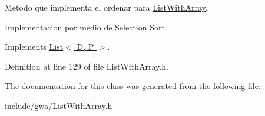 Metodo que implementa el ordenar para \hyperlink{class_list_with_array}{List\+With\+Array}. 

Implementacion por medio de Selection Sort 

Implements \hyperlink{class_list_ae3795939f27cf3e688cd470450e0c27a}{List$<$ D, P $>$}.



Definition at line 129 of file List\+With\+Array.\+h.



The documentation for this class was generated from the following file\+:\begin{DoxyCompactItemize}
\item 
include/gwa/\hyperlink{_list_with_array_8h}{List\+With\+Array.\+h}\end{DoxyCompactItemize}
